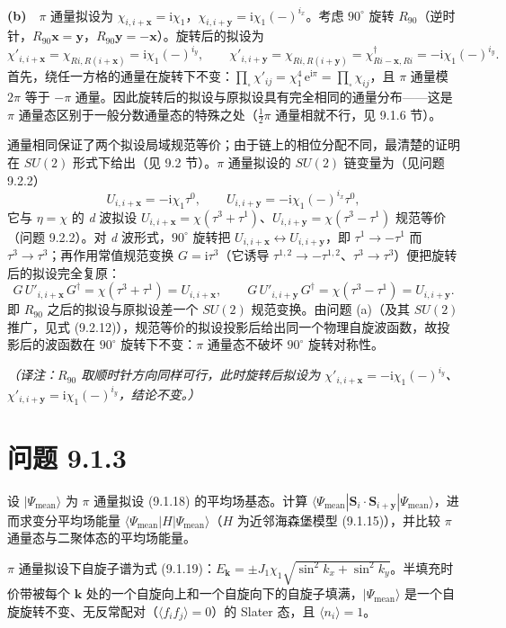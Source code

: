 \textbf{(b)}　$\pi$ 通量拟设为 $\chi_{i,i+\pmb{x}}=\mathrm{i}\chi_1$，$\chi_{i,i+\pmb{y}}=\mathrm{i}\chi_1(-)^{i_x}$。考虑 $90^{\circ}$ 旋转 $R_{90}$（逆时针，$R_{90}\pmb{x}=\pmb{y}$，$R_{90}\pmb{y}=-\pmb{x}$）。旋转后的拟设为
\begin{equation*}
\chi'_{i,i+\pmb{x}}=\chi_{Ri,R(i+\pmb{x})}=\mathrm{i}\chi_1(-)^{i_y},\qquad
\chi'_{i,i+\pmb{y}}=\chi_{Ri,R(i+\pmb{y})}=\chi^{\dagger}_{Ri-\pmb{x},Ri}=-\mathrm{i}\chi_1(-)^{i_y}.
\end{equation*}
首先，绕任一方格的通量在旋转下不变：$\prod_{\square}\chi'_{ij}=\chi_1^4\,\mathrm{e}^{\mathrm{i}\pi}=\prod_{\square}\chi_{ij}$，且 $\pi$ 通量模 $2\pi$ 等于 $-\pi$ 通量。因此旋转后的拟设与原拟设具有完全相同的通量分布——这是 $\pi$ 通量态区别于一般分数通量态的特殊之处（$\frac12\pi$ 通量相就不行，见 9.1.6 节）。

通量相同保证了两个拟设局域规范等价；由于链上的相位分配不同，最清楚的证明在 $SU(2)$ 形式下给出（见 9.2 节）。$\pi$ 通量拟设的 $SU(2)$ 链变量为（见问题 9.2.2）
\begin{equation*}
U_{i,i+\pmb{x}}=-\mathrm{i}\chi_1\tau^0,\qquad U_{i,i+\pmb{y}}=-\mathrm{i}\chi_1(-)^{i_x}\tau^0 ,
\end{equation*}
它与 $\eta=\chi$ 的 \emph{d} 波拟设 $U_{i,i+\pmb{x}}=\chi(\tau^3+\tau^1)$、$U_{i,i+\pmb{y}}=\chi(\tau^3-\tau^1)$ 规范等价（问题 9.2.2）。对 \emph{d} 波形式，$90^{\circ}$ 旋转把 $U_{i,i+\pmb{x}}\leftrightarrow U_{i,i+\pmb{y}}$，即 $\tau^1\to-\tau^1$ 而 $\tau^3\to\tau^3$；再作用常值规范变换 $G=\mathrm{i}\tau^3$（它诱导 $\tau^{1,2}\to-\tau^{1,2}$、$\tau^3\to\tau^3$）便把旋转后的拟设完全复原：
\begin{equation*}
G\,U'_{i,i+\pmb{x}}\,G^{\dagger}=\chi(\tau^3+\tau^1)=U_{i,i+\pmb{x}},\qquad
G\,U'_{i,i+\pmb{y}}\,G^{\dagger}=\chi(\tau^3-\tau^1)=U_{i,i+\pmb{y}} .
\end{equation*}
即 $R_{90}$ 之后的拟设与原拟设差一个 $SU(2)$ 规范变换。由问题 (a)（及其 $SU(2)$ 推广，见式 (9.2.12)），规范等价的拟设投影后给出同一个物理自旋波函数，故投影后的波函数在 $90^{\circ}$ 旋转下不变：$\pi$ 通量态不破坏 $90^{\circ}$ 旋转对称性。

\emph{（译注：$R_{90}$ 取顺时针方向同样可行，此时旋转后拟设为 $\chi'_{i,i+\pmb{x}}=-\mathrm{i}\chi_1(-)^{i_y}$、$\chi'_{i,i+\pmb{y}}=\mathrm{i}\chi_1(-)^{i_y}$，结论不变。）}

\section*{问题 9.1.3}
\begin{problem}
设 $|\Psi_{\text{mean}}\rangle$ 为 $\pi$ 通量拟设 (9.1.18) 的平均场基态。计算 $\langle\Psi_{\text{mean}}|\pmb{S}_i\cdot\pmb{S}_{i+\pmb{y}}|\Psi_{\text{mean}}\rangle$，进而求变分平均场能量 $\langle\Psi_{\text{mean}}|H|\Psi_{\text{mean}}\rangle$（$H$ 为近邻海森堡模型 (9.1.15)），并比较 $\pi$ 通量态与二聚体态的平均场能量。
\end{problem}
\solution
$\pi$ 通量拟设下自旋子谱为式 (9.1.19)：$E_{\pmb{k}}=\pm J_1\chi_1\sqrt{\sin^2k_x+\sin^2k_y}$。半填充时价带被每个 $\pmb{k}$ 处的一个自旋向上和一个自旋向下的自旋子填满，$|\Psi_{\text{mean}}\rangle$ 是一个自旋旋转不变、无反常配对（$\langle f_if_j\rangle=0$）的 Slater 态，且 $\langle n_i\rangle=1$。

